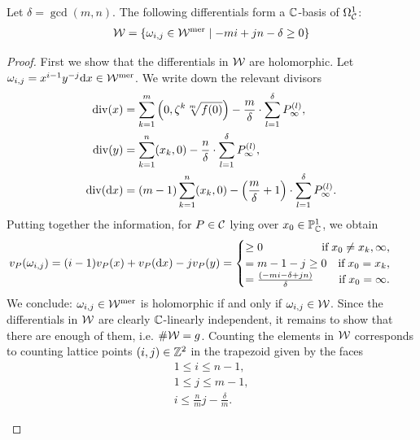 \documentclass[main.tex]{subfiles}
\begin{document}
   \bigskip

     \begin{prop}\label{prop:holom_diff}
 Let $\delta = \gcd(m,n)$. The following differentials form  a $\mathbb{C}$-basis of $\Omega^1_{\mathcal{C}}$:
 \begin{align}\label{eq:holm_diff}
   \mathcal{W} =  \left\{  \omega_{i,j} \in \mathcal{W}^{\text{mer}}  \mid  -mi + jn - \delta \ge 0  \right\}
 \end{align}
     \end{prop}
     \begin{proof}
      First we show that the differentials in $\mathcal{W}$ are holomorphic.
      Let $\omega_{i,j} = x^{i-1}y^{-j} \mathrm d x \in \mathcal{W}^{\text{mer}}$. We write down the relevant divisors
      \begin{align*}
       \operatorname{div}(x) & = \sum_{k=1}^m \left(0,\zeta^k\sqrt[m]{f(0)}\right) - \frac{m}{\delta} \cdot \sum_{l = 1}^{\delta} P_{\infty}^{(l)}, \\
       \operatorname{div}(y) & = \sum_{k = 1}^n (x_k,0) - \frac{n}{\delta} \cdot \sum_{l = 1}^{\delta}  P_{\infty}^{(l)}, \\
       \operatorname{div}(\mathrm d x) & = (m-1)\sum_{k = 1}^n (x_k,0) - \left(\frac{m}{\delta} + 1\right)\cdot \sum_{l = 1}^{\delta}  P_{\infty}^{(l)}.
      \end{align*}
     Putting together the information, for $P \in \mathcal{C}$ lying over $x_0 \in \mathbb{P}^1_{\mathbb{C}}$, we obtain
     \begin{align}\label{eq:diff_cases}
      v_P(\omega_{i,j}) & = (i-1) v_P(x) + v_P(\dx)  - j v_P(y) =
 \begin{cases}
  \ge 0 \hfill \text{if} \; x_0 \ne x_k,\infty, \\
  = m-1-j \ge 0 \quad \text{if} \; x_0 = x_k, \\
  = \frac{(-mi-\delta+jn)}{\delta} \hfill \text{if}\;  x_0 = \infty.
 \end{cases}
     \end{align}
     We conclude: $\omega_{i,j} \in \mathcal{W}^{\text{mer}}$ is holomorphic if and only if $\omega_{i,j} \in \mathcal{W}$. \abstand
     Since the differentials in $\mathcal{W}$ are clearly $\mathbb{C}$-linearly independent, it remains to show that
     there are enough of them, i.e. $\#\mathcal{W} = g$. \abstand
     Counting the elements in $\mathcal{W}$ corresponds to counting lattice points $(i,j) \in \mathbb{Z}^2$ in the trapezoid given by the faces
     \begin{align*}
 1 \le i \le n-1,\\
 1 \le j \le m-1, \\
 i \le \frac{n}{m}j - \frac{\delta}{m}.
     \end{align*}
      \begin{figure}[H]

\end{figure}
\end{proof}
\end{document}
